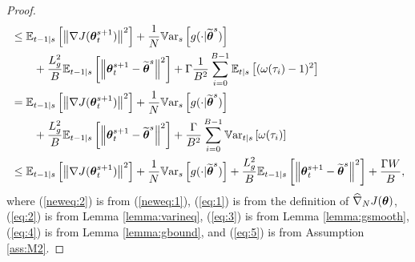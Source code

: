 \begin{proof}
\begin{align}
	&\leq \Ets[t-1]{\norm[]{\gradJ{\vtheta_t^{s+1}}}^2} 
	+\frac{1}{N}\Vars{g(\cdot\vert\wt{\vtheta}^s)}
	\nonumber\\
	&\qquad+\frac{L_g^2}{B}\Ets[t-1]{\norm[]{\vtheta_t^{s+1}-\wt{\vtheta}^s}^2}
	+\Gamma\frac{1}{B^2}\sum_{i=0}^{B-1}\Ets{(\omega(\tau_i)-1)^2} \label{eq:4}\\
	&= \Ets[t-1]{\norm[]{\gradJ{\vtheta_t^{s+1}}}^2} 
	+\frac{1}{N}\Vars{g(\cdot\vert\wt{\vtheta}^s)}
	\nonumber\\&\qquad
	+\frac{L_g^2}{B}\Ets[t-1]{\norm[]{\vtheta_t^{s+1}-\wt{\vtheta}^s}^2}
	+\frac{\Gamma}{B^2}\sum_{i=0}^{B-1}\Varts{\omega(\tau_i)} \nonumber\\
	&\leq \Ets[t-1]{\norm[]{\gradJ{\vtheta_t^{s+1}}}^2} 
	+\frac{1}{N}\Vars{g(\cdot\vert\wt{\vtheta}^s)}
	+\frac{L_g^2}{B}\Ets[t-1]{\norm[]{\vtheta_t^{s+1}-\wt{\vtheta}^s}^2}
	+\frac{\Gamma\VARIS}{B}, \label{eq:5}
	\end{align}
	\restoregeometry
	\endgroup
	where (\ref{neweq:2}) is from (\ref{neweq:1}), (\ref{eq:1}) is from the definition of $\gradApp{\vtheta}{N}$, (\ref{eq:2}) is from Lemma \ref{lemma:varineq}, (\ref{eq:3}) is from Lemma \ref{lemma:gsmooth}, 
	(\ref{eq:4}) is from Lemma \ref{lemma:gbound}, and (\ref{eq:5}) is from Assumption \ref{ass:M2}.
\end{proof}

